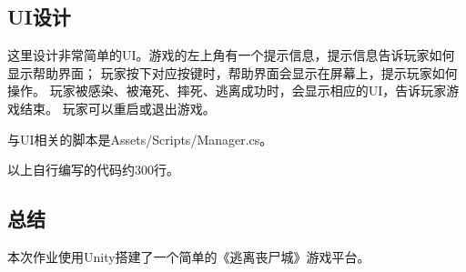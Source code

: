 \documentclass{article}
\begin{document}
\subsection{UI设计}

这里设计非常简单的UI。游戏的左上角有一个提示信息，提示信息告诉玩家如何显示帮助界面；
玩家按下对应按键时，帮助界面会显示在屏幕上，提示玩家如何操作。
玩家被感染、被淹死、摔死、逃离成功时，会显示相应的UI，告诉玩家游戏结束。
玩家可以重启或退出游戏。

与UI相关的脚本是Assets/Scripts/Manager.cs。

以上自行编写的代码约300行。

\subsection{总结}

本次作业使用Unity搭建了一个简单的《逃离丧尸城》游戏平台。
\end{document}
